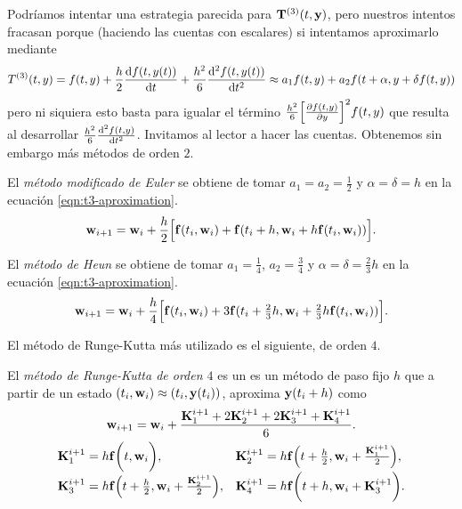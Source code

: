 Podríamos intentar una estrategia parecida para $\vb{T}^{(3)}(t, \vb{y})$,
pero nuestros intentos fracasan porque
(haciendo las cuentas con escalares)
si intentamos aproximarlo mediante
\begin{equation}\label{eqn:t3-aproximation}
    T^{(3)}(t,y) =
    f(t,y) + \frac{h}{2}\dv{f(t, y(t))}{t}
        + \frac{h^2}{6}\dv[2]{f(t, y(t))}{t} \approx
    a_1f(t,y) + a_2f(t + \alpha, y + \delta f(t,y))
\end{equation}
pero ni siquiera esto basta para igualar el término
$\frac{h^2}{6}\qty[\pdv{f(t, y)}{y}]^2f(t,y)$
que resulta al desarrollar $\frac{h^2}{6}\dv[2]{f(t, y)}{t}$.
Invitamos al lector a hacer las cuentas.
Obtenemos sin embargo más métodos de orden $2$.

\begin{method}
    El \emph{método modificado de Euler} se obtiene de
    tomar $a_1 = a_2 = \frac{1}{2}$ y $\alpha = \delta = h$
    en la ecuación  \eqref{eqn:t3-aproximation}.
    \begin{equation*}
        \vb{w}_{i+1} = \vb{w}_i + \frac{h}{2}\qty\Big[
            \vb{f}(t_i, \vb{w}_i) + \vb{f}(t_i + h, \vb{w}_i + h\vb{f}(t_i,\vb{w}_i))
        ].
    \end{equation*}
\end{method}

\begin{method}
    El \emph{método de Heun} se obtiene de tomar $a_1 = \frac{1}{4}$,
    $a_2 = \frac{3}{4}$ y $\alpha = \delta = \frac{2}{3}h$
    en la ecuación \eqref{eqn:t3-aproximation}.
    \begin{equation*}
        \vb{w}_{i+1} = \vb{w}_i + \frac{h}{4}\qty\Big[
            \vb{f}(t_i, \vb{w}_i) +
            3\vb{f}(t_i + \tfrac{2}{3}h, \vb{w}_i + \tfrac{2}{3}h\vb{f}(t_i, \vb{w}_i))
        ].
    \end{equation*}

\end{method}

El método de Runge-Kutta más utilizado es el siguiente, de orden $4$.

\begin{method}\label{met:euler}
    \newcommand{\K}{\vb{K}}

    El \emph{método de Runge-Kutta de orden $4$}
    es un es un método de paso fijo $h$ que
    a partir de un estado $(t_i, \vb{w}_i) \approx (t_i, \vb{y}(t_i))$,
    aproxima $\vb{y}(t_i + h)$ como
    \begin{gather*}
        \vw_{i+1} = \vw_i + \frac{
            \K_1^{i+1} + 2\K_2^{i+1} + 2\K_3^{i+1} + \K_4^{i+1}
        }{6}. \\
        \begin{array}{ll}
        \K_1^{i+1} = h\vf\qty\bigg(t, \vw_i), &
        \K_2^{i+1} = h\vf\qty(t + \frac{h}{2}, \vw_i+ \frac{\K_1^{i+1}}{2}), \\
        \K_3^{i+1} = h\vf\qty(t + \frac{h}{2}, \vw_i+ \frac{\K_2^{i+1}}{2}), &
        \K_4^{i+1} = h\vf\qty\bigg(t + h, \vw_i + \K_3^{i+1}).
        \end{array}
    \end{gather*}
\end{method}

